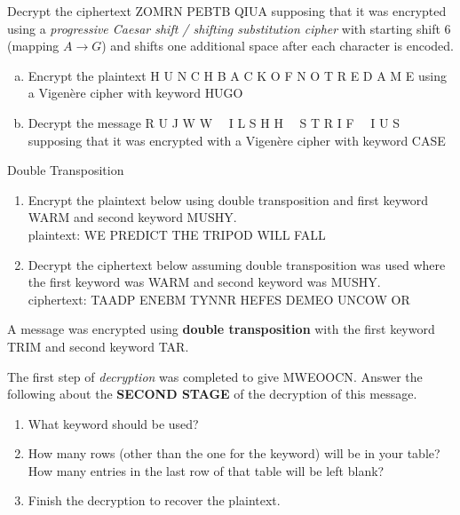 \documentclass[11pt, oneside]{article}   	%
\newcommand{\be}{\begin{enumerate}}
\newcommand{\ee}{\end{enumerate}}
\begin{document}
  Decrypt the ciphertext \textsf{ZOMRN PEBTB QIUA} supposing that  it was encrypted using a \emph{progressive Caesar shift / shifting substitution  cipher} with starting shift 6 (mapping $A \to G$) and shifts one additional space after each character is encoded.


\be[(a)]
\item Encrypt the plaintext \textsf{H U N C H B A C K O F N O T R E D A M E} using a Vigen\`ere cipher with keyword \textsf{HUGO}
\item Decrypt the message \textsf{R U J W W \ \ I L S H H \ \ S T R I F \ \  I U S} supposing that it was encrypted with a Vigen\`ere cipher with keyword \textsf{CASE}
\ee

 Double Transposition
	\begin{enumerate}
	\item[(a)] Encrypt the plaintext below using double transposition and first keyword WARM and second keyword MUSHY.\\
	plaintext: WE PREDICT THE TRIPOD WILL FALL\\
	\item[(b)] Decrypt the ciphertext below assuming double transposition was used where the first keyword was WARM and second keyword was MUSHY.\\
	ciphertext:  TAADP ENEBM TYNNR HEFES DEMEO UNCOW OR\\
	\end{enumerate}

 A message was encrypted using {\bf double
transposition} with the first keyword \textsf{TRIM} and second keyword
\textsf{TAR}.

The first step of \emph{decryption} was completed to give
\textsf{MWEOOCN}.
Answer the following about the \textbf{SECOND STAGE} of the decryption
of this message.

\begin{enumerate}
\item What keyword should be used?

\item How many rows (other than the one for the keyword) will
be in your table? How many entries in the last row of that table will
be left blank?

\item Finish the decryption to recover the plaintext.
\end{enumerate}
	
\end{document}
